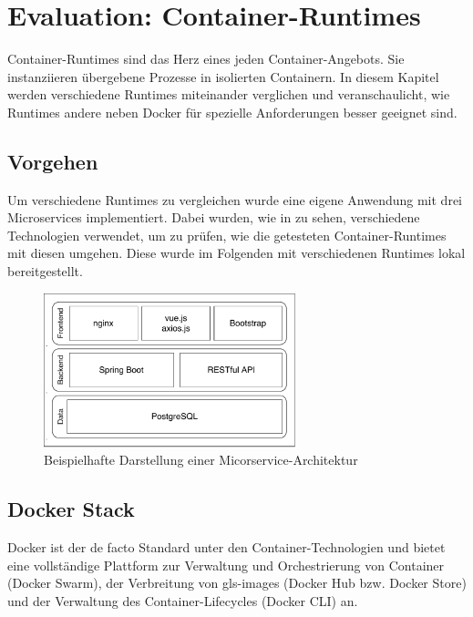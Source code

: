 \chapter{Evaluation: Container-Runtimes}
\label{chap:compCtnrRuntimes}

Container-Runtimes sind das Herz eines jeden Container-Angebots. Sie instanziieren übergebene Prozesse in isolierten Containern. In diesem Kapitel werden verschiedene Runtimes miteinander verglichen und veranschaulicht, wie Runtimes andere neben Docker für spezielle Anforderungen besser geeignet sind.

\section{Vorgehen}
\label{sec:vorgehen}
Um verschiedene Runtimes zu vergleichen wurde eine eigene Anwendung mit drei Microservices implementiert. Dabei wurden, wie in  zu sehen, verschiedene Technologien verwendet, um zu prüfen, wie die getesteten Container-Runtimes mit diesen umgehen. Diese wurde im Folgenden mit verschiedenen Runtimes lokal bereitgestellt.

\begin{figure}[h]
	\begin{center}
		\includegraphics[width=0.65\textwidth]{bilder/microservice-example-stack.pdf}
		\caption{Beispielhafte Darstellung einer Micorservice-Architektur}
		\label{fig:todosStack}
	\end{center}
\end{figure}

\section{Docker Stack}
\label{sec:compDocker}
Docker ist der de facto Standard unter den Container-Technologien und bietet eine vollständige Plattform zur Verwaltung und Orchestrierung von Container (Docker Swarm), der Verbreitung von \glspl{gls-image} (Docker Hub bzw. Docker Store) und der Verwaltung des Container-Lifecycles (Docker CLI) an.


